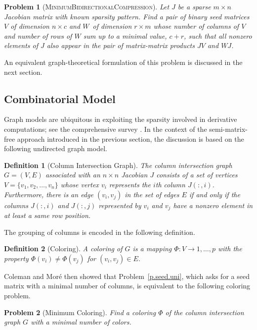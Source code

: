 \documentclass[12pt, oneside]{book}
\newtheorem{problem}{Problem}
\newtheorem{definition}{Definition}
\newcommand{\col}{\ensuremath{c}}
\newcommand{\row}{\ensuremath{r}}
\newcommand{\MinBidCom}{\textsc{MinimumBidirectionalCompression}}
\begin{document}
\begin{problem}[\MinBidCom]
\label{p.seed.bid} Let $J$ be a sparse ${m\times n}$ Jacobian matrix with known sparsity
pattern. Find a pair of binary seed matrices $V$ of dimension $n\times \col$ and $W$~of
dimension $\row \times m$ whose number of columns of $V$ and number of rows of $W$ sum up
to a minimal value, $\col + \row$, such that all nonzero elements of $J$ also appear in
the pair of matrix-matrix products $JV$ and $WJ$.
\end{problem}

An equivalent graph-theoretical formulation of this problem is discussed in the next
section.

\subsection{Combinatorial Model}
\label{s.modeling}
Graph models are ubiquitous in exploiting the sparsity involved in derivative
computations; see the comprehensive survey \cite{Gebremedhin05whatcolor}. In the context of the
semi-matrix-free approach introduced in the previous section, the discussion is based on
the following undirected graph model.
%
\begin{definition}[Column Intersection Graph]
\label{d:cig}
The column intersection graph $G = (V,E)$ associated with an $n \times n$ Jacobian $J$
consists of a set of vertices $V=\{v_1, v_2, \dots, v_n\}$ whose vertex $v_i$ represents
the $i$th column $J(:,i)$. Furthermore, there is an edge $(v_i,v_j)$ in the set of edges
$E$ if and only if the columns $J(:,i)$ and $J(:,j)$ represented by $v_i$ and $v_j$ have
a nonzero element in at least a same row position.
\end{definition}

The grouping of columns is encoded in the following definition.
%
\begin{definition}[Coloring]
A coloring of $G$ is a mapping $\Phi : V \to {1, \dots, p}$ with the property
$\Phi(v_i)\neq \Phi(v_j)$ for $(v_i,v_j) \in E$.
\end{definition}
%
Coleman and Mor\'{e} \cite{Coleman1983EoS} then showed that Problem~\ref{p.seed.uni}, which
asks for a seed matrix with a minimal number of columns, is equivalent to the following
coloring problem.
%
\begin{problem}[Minimum Coloring]
\label{p:mincol}
%
Find a coloring $\Phi$ of the column intersection graph $G$ with a minimal number of
colors.
\end{problem}
\end{document}
